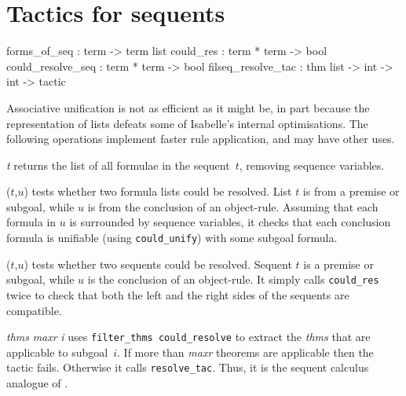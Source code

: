 \section{Tactics for sequents}
\begin{ttbox} 
forms_of_seq       : term -> term list
could_res          : term * term -> bool
could_resolve_seq  : term * term -> bool
filseq_resolve_tac : thm list -> int -> int -> tactic
\end{ttbox}
Associative unification is not as efficient as it might be, in part because
the representation of lists defeats some of Isabelle's internal
optimisations.  The following operations implement faster rule application,
and may have other uses.
\begin{ttdescription}
\item[\ttindexbold{forms_of_seq} {\it t}] 
returns the list of all formulae in the sequent~$t$, removing sequence
variables.

\item[\ttindexbold{could_res} ($t$,$u$)] 
tests whether two formula lists could be resolved.  List $t$ is from a
premise or subgoal, while $u$ is from the conclusion of an object-rule.
Assuming that each formula in $u$ is surrounded by sequence variables, it
checks that each conclusion formula is unifiable (using {\tt could_unify})
with some subgoal formula.

\item[\ttindexbold{could_resolve_seq} ($t$,$u$)] 
  tests whether two sequents could be resolved.  Sequent $t$ is a premise
  or subgoal, while $u$ is the conclusion of an object-rule.  It simply
  calls {\tt could_res} twice to check that both the left and the right
  sides of the sequents are compatible.

\item[\ttindexbold{filseq_resolve_tac} {\it thms} {\it maxr} {\it i}] 
uses {\tt filter_thms could_resolve} to extract the {\it thms} that are
applicable to subgoal~$i$.  If more than {\it maxr\/} theorems are
applicable then the tactic fails.  Otherwise it calls {\tt resolve_tac}.
Thus, it is the sequent calculus analogue of .
\end{ttdescription}


